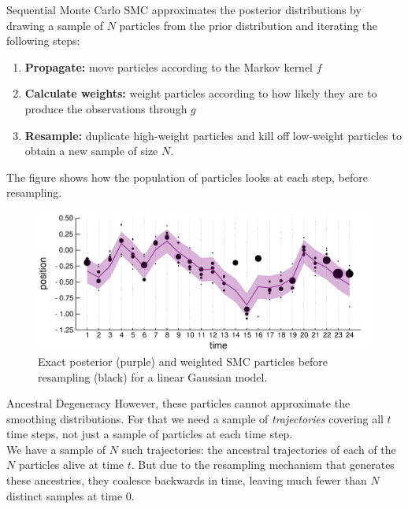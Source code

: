 \documentclass[final, 12pt]{beamer}
\newlength{\colwidth}
\begin{document}
\begin{frame}
\begin{columns}
\begin{column}{\colwidth}
\begin{block}{Sequential Monte Carlo}
SMC approximates the posterior distributions by drawing a sample of $N$ particles from the prior distribution and iterating the following steps:
\begin{enumerate}
\item \textbf{Propagate:} move particles according to the Markov kernel $f$
\item \textbf{Calculate weights:} weight particles according to how likely they are to produce the observations through $g$
\item \textbf{Resample:} duplicate high-weight particles and kill off low-weight particles to obtain a new sample of size $N$.
\end{enumerate}

\vspace*{10pt}

The figure shows how the population of particles looks at each step, before resampling.
\begin{figure}
\includegraphics[width=\colwidth]{smc_kalman.pdf}
\caption{Exact posterior (purple) and weighted SMC particles before resampling (black) for a linear Gaussian model.}
\end{figure}
\end{block}

\begin{block}{Ancestral Degeneracy}
However, these particles cannot approximate the smoothing distributions. For that we need a sample of \emph{trajectories} covering all $t$ time steps, not just a sample of particles at each time step.\\[10pt]

We have a sample of $N$ such trajectories: the ancestral trajectories of each of the $N$ particles alive at time $t$.
But due to the resampling mechanism that generates these ancestries, they coalesce backwards in time, leaving much fewer than $N$ distinct samples at time 0. 


\end{block}
\end{column}
\end{columns}
\end{frame}
\end{document}
